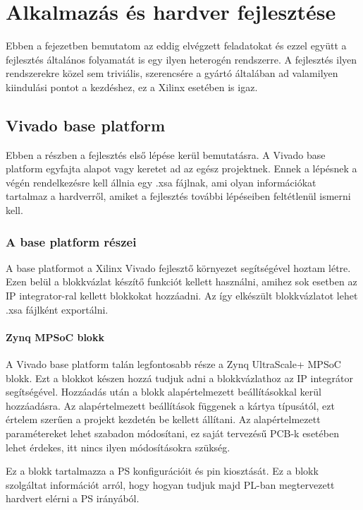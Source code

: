 \chapter{Alkalmazás és hardver fejlesztése}

Ebben a fejezetben bemutatom az eddig elvégzett feladatokat és ezzel együtt a fejlesztés általános folyamatát is egy ilyen heterogén rendszerre. A fejlesztés ilyen rendszerekre közel sem triviális, szerencsére a gyártó általában ad valamilyen kiindulási pontot a kezdéshez, ez a Xilinx esetében is igaz.
\cite{Tutorial}

\section{Vivado base platform}
Ebben a részben a fejlesztés első lépése kerül bemutatásra. A Vivado base platform egyfajta alapot vagy keretet ad az egész projektnek. Ennek a lépésnek a végén rendelkezésre kell állnia egy .xsa fájlnak, ami olyan információkat tartalmaz a hardverről, amiket a fejlesztés további lépéseiben feltétlenül ismerni kell.

\subsection{A base platform részei}
A base platformot a Xilinx Vivado fejlesztő környezet segítségével hoztam létre. Ezen belül a blokkvázlat készítő funkciót kellett használni, amihez sok esetben az IP integrator-ral kellett blokkokat hozzáadni. Az így elkészült blokkvázlatot lehet .xsa fájlként exportálni.

\subsubsection{Zynq MPSoC blokk}
A Vivado base platform talán legfontosabb része a Zynq UltraScale+ MPSoC blokk. Ezt a blokkot készen hozzá tudjuk adni a blokkvázlathoz az IP integrátor segítségével. Hozzáadás után a blokk alapértelmezett beállításokkal kerül hozzáadásra. Az alapértelmezett beállítások függenek a kártya típusától, ezt értelem szerűen a projekt kezdetén be kellett állítani. Az alapértelmezett paramétereket lehet szabadon módosítani, ez saját tervezésű PCB-k esetében lehet érdekes, itt nincs ilyen módosításokra szükség.

Ez a blokk tartalmazza a PS konfigurációit és pin kiosztását. Ez a blokk szolgáltat információt arról, hogy hogyan tudjuk majd PL-ban megtervezett hardvert elérni a PS irányából.


